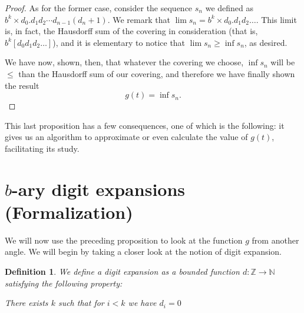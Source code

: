 \documentclass[11pt, reqno]{amsart}
\newcommand{\Z}{\mathbb{Z}}
\newcommand{\N}{\mathbb{N}}
\newtheorem{definition}{Definition}
\begin{document}
\begin{proof}
As for the former case, consider the sequence $s_n$ we defined as $b^k \times d_0 . d_1 d_2 \cdots d_{n-1} (d_n + 1)$. We remark that $\lim s_n = b^k \times d_0 . d_1 d_2 \dots$. This limit is, in fact, the Hausdorff sum of the covering in consideration (that is, $b^k [d_0 d_1 d_2 \dots]$), and it is elementary to notice that $\lim s_n \geq \inf s_n$, as desired.

We have now, shown, then, that whatever the covering we choose, $\inf s_n$ will be $\leq$ than the Hausdorff sum of our covering, and therefore we have finally shown the result
\[ g(t) = \inf s_n.\]

\iffalse
Now, to show we can assume all intervals to be disjoint: fix any point $a$ in $\cup I_i$. Define $J_a$ to be \emph{the biggest interval in $A$ containing $a$}. We propose, now, that the covering $A' = \{ J_a \}$ covers exactly the same points as $A$, while having a Hausdorff sum less than or equal to that of $A$, as well as having all its intervals be disjoint.

The first two properties are trivial, so we devote our attention only to the third one: suppose, for the sake of argument, that $J_a$ and $J_b$ are not disjoint. The structure of the $b$-ary intervals mandates that either $J_a \subseteq J_b$ or $J_b \subseteq J_a$; suppose the former for the sake of argument. Then, $a \in J_b$, which implies $J_a$ is of length greater than or equal to that of $J_b$ (by definition), and so, in fact, $J_a = J_b$.

This digression completed, we may go back to the problem at hand.
\fi
\end{proof}

This last proposition has a few consequences, one of which is the following: it gives us an algorithm to approximate or even calculate the value of $g(t)$, facilitating its study.

\section{$b$-ary digit expansions (Formalization)}\label{sec7}

We will now use the preceding proposition to look at the function $g$ from another angle. We will begin by taking a closer look at the notion of digit expansion.

\begin{definition}
We define a \emph{digit expansion} as a \emph{bounded} function $d : \Z \to \N$ satisfying the following property:

\begin{center}
There exists $k$ such that for $i < k$ we have $d_i = 0$
\end{center}
\end{definition}
\end{document}

